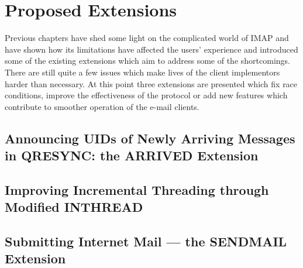 \documentclass[trojita]{subfiles}
\begin{document}
\chapter{Proposed Extensions}

Previous chapters have shed some light on the complicated world of IMAP and have shown how its limitations have
affected the users' experience and introduced some of the existing extensions which aim to address some of the
shortcomings.  There are still quite a few issues which make lives of the client implementors harder than necessary.  At
this point three extensions are presented which fix race conditions, improve the effectiveness of the protocol or add new
features which contribute to smoother operation of the e-mail clients.

\section{Announcing UIDs of Newly Arriving Messages in QRESYNC: the ARRIVED Extension}
\label{sec:draft-arrived}

\section{Improving Incremental Threading through Modified INTHREAD}
\label{sec:draft-inthread-ext}

\section{Submitting Internet Mail --- the SENDMAIL Extension}
\label{sec:draft-sendmail}
\end{document}
